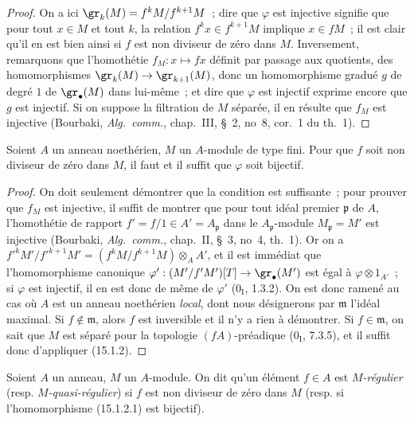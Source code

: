 \begin{proof}
On a ici $\gr_k(M)=f^kM/f^{k+1}M$~; dire que $\varphi$ est injective signifie
que pour tout $x\in M$ et tout $k$, la relation $f^kx\in f^{k+1}M$ implique
$x\in fM$~; il est clair qu'il en est bien ainsi si $f$ est non diviseur de
zéro dans $M$. Inversement, remarquons que l'homothétie
$f_M:x\mapsto fx$ définit par passage aux quotients, des homomorphismes
$\gr_k(M)\to\gr_{k+1}(M)$, donc un homomorphisme gradué $g$ de degré $1$ de
$\gr_\bullet(M)$ dans lui-même~; et dire que $\varphi$ est injectif exprime
encore que $g$ est injectif. Si on suppose la filtration de $M$ séparée, il en
résulte que $f_M$ est injective (Bourbaki, \emph{Alg.~comm.}, chap.~III,
\S~2, no~8, cor.~1 du th.~1).
\end{proof}

\begin{corollary}[15.1.3]
\label{0.15.1.3-fr}
Soient $A$ un anneau noethérien, $M$ un $A$-module de type fini. Pour que $f$
soit non diviseur de zéro dans $M$, il faut et il suffit que $\varphi$ soit
bijectif.
\end{corollary}

\begin{proof}
On doit seulement démontrer que la condition est suffisante~; pour prouver
que $f_M$ est injective, il suffit de montrer que pour tout idéal premier
$\mathfrak p$ de $A$, l'homothétie de rapport
$f'=f/1\in A'=A_{\mathfrak p}$ dans le $A_{\mathfrak p}$-module
$M_{\mathfrak p}=M'$ est injective (Bourbaki, \emph{Alg.~comm.}, chap.~II,
\S~3, no~4, th.~1). Or on a
$f'^kM'/f'^{k+1}M'=(f^kM/f^{k+1}M)\otimes_A A'$, et il est immédiat que
l'homomorphisme canonique
$\varphi':(M'/f'M')[T]\to\gr_\bullet(M')$ est égal à
$\varphi\otimes 1_{A'}$~; si $\varphi$ est injectif, il en est donc de même de
$\varphi'$ ($0_{\mathrm I}$, 1.3.2). On est donc ramené au cas où $A$ est un
anneau noethérien \emph{local}, dont nous désignerons par $\mathfrak m$
l'idéal maximal. Si $f\notin\mathfrak m$, alors $f$ est inversible et il n'y a
rien à démontrer. Si $f\in\mathfrak m$, on sait que $M$ est séparé pour la
topologie $(fA)$-préadique ($0_{\mathrm I}$, 7.3.5), et il suffit donc
d'appliquer (15.1.2).
\end{proof}

\begin{definition}[15.1.4]
\label{0.15.1.4-fr}
Soient $A$ un anneau, $M$ un $A$-module. On dit qu'un élément $f\in A$ est
\emph{$M$-régulier} (resp. \emph{$M$-quasi-régulier}) si $f$ est non diviseur
de zéro dans $M$ (resp. si l'homomorphisme (15.1.2.1) est bijectif).
\end{definition}

